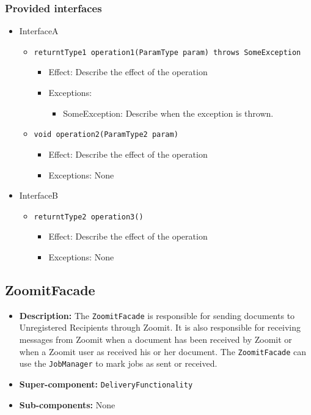 \documentclass[a4paper,10pt]{article}
\begin{document}
\subsubsection*{Provided interfaces}
\begin{itemize}
    \item InterfaceA
    \begin{itemize}
        \item \texttt{returntType1 operation1(ParamType param) throws SomeException}
        \begin{itemize}
            \item Effect: Describe the effect of the operation
            \item Exceptions:
            \begin{itemize}
                \item SomeException: Describe when the exception is thrown.
            \end{itemize}
		\end{itemize}
        \item \texttt{void operation2(ParamType2 param)}
        \begin{itemize}
            \item Effect: Describe the effect of the operation
            \item Exceptions: None
        \end{itemize}
    \end{itemize}

    \item InterfaceB
    \begin{itemize}
        \item \texttt{returntType2 operation3()}
        \begin{itemize}
            \item Effect: Describe the effect of the operation
            \item Exceptions: None
        \end{itemize}
    \end{itemize}
\end{itemize}

\subsection{ZoomitFacade}
\begin{itemize}
    \item \textbf{Description:} The \texttt{ZoomitFacade} is responsible for sending documents to Unregistered Recipients through Zoomit. It is also responsible for receiving messages from Zoomit when a document has been received by Zoomit or when a Zoomit user as received his or her document. The \texttt{ZoomitFacade} can use the \texttt{JobManager} to mark jobs as sent or received.
    \item \textbf{Super-component:} \texttt{DeliveryFunctionality}
    \item \textbf{Sub-components:} None
\end{itemize}
\end{document}
